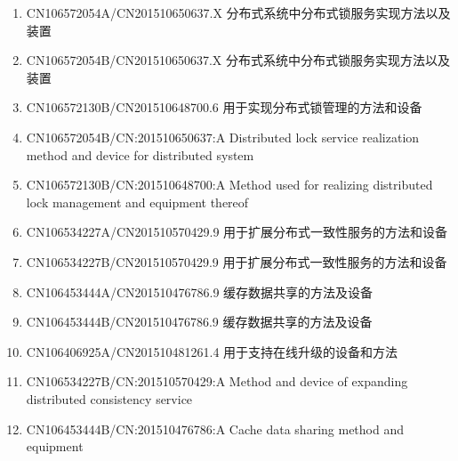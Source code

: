 \documentclass[scheme=plain]{ctexart}
\begin{document}
\begin{enumerate}
    \item CN106572054A/CN201510650637.X 分布式系统中分布式锁服务实现方法以及装置
    \item CN106572054B/CN201510650637.X 分布式系统中分布式锁服务实现方法以及装置
    \item CN106572130B/CN201510648700.6 用于实现分布式锁管理的方法和设备
    \item CN106572054B/CN:201510650637:A Distributed lock service realization method and device for distributed system
    \item CN106572130B/CN:201510648700:A Method used for realizing distributed lock management and equipment thereof
    \item CN106534227A/CN201510570429.9 用于扩展分布式一致性服务的方法和设备
    \item CN106534227B/CN201510570429.9 用于扩展分布式一致性服务的方法和设备
    \item CN106453444A/CN201510476786.9 缓存数据共享的方法及设备
    \item CN106453444B/CN201510476786.9 缓存数据共享的方法及设备
    \item CN106406925A/CN201510481261.4 用于支持在线升级的设备和方法
    \item CN106534227B/CN:201510570429:A Method and device of expanding distributed consistency service
    \item CN106453444B/CN:201510476786:A Cache data sharing method and equipment
\end{enumerate}
\end{document}
